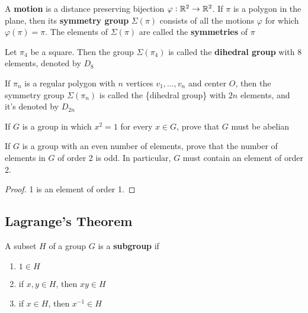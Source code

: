 \documentclass[11pt]{article}
\begin{document}
\begin{definition}[]
A \textbf{motion} is a distance preserving bijection \(\varphi:\mathbb{R}^2\to\mathbb{R}^2\). If
\(\pi\) is a polygon in the plane, then its \textbf{symmetry group} \(\Sigma(\pi)\)
consists of all the motions \(\varphi\) for which \(\varphi(\pi)=\pi\). The
elements of \(\Sigma(\pi)\) are called the \textbf{symmetries} of \(\pi\)
\end{definition}

Let \(\pi_4\) be a square. Then the group \(\Sigma(\pi_4)\) is called the
\textbf{dihedral group} with 8 elements, denoted by \(D_8\)

\begin{definition}[]
If \(\pi_n\) is a regular polygon with \(n\) vertices \(v_1,\dots,v_n\) and center
\(O\), then the symmetry group \(\Sigma(\pi_n)\) is called the \tf\{dihedral
group\} with \(2n\) elements, and it's denoted by \(D_{2n}\)
\end{definition}

\begin{exercise}
\label{ex2.26}
If \(G\) is a group in which \(x^2=1\) for every \(x\in G\), prove that \(G\)
must be abelian
\end{exercise}

\begin{exercise}
\label{ex2.27}
If \(G\) is a group with an even number of elements, prove that the number of
elements in \(G\) of order 2 is odd. In particular, \(G\) must contain an element of
order 2.
\end{exercise}

\begin{proof}
1 is an element of order 1.
\end{proof}
\subsection{Lagrange's Theorem}
\label{sec:org8824cfe}
\begin{theorem}[]

\end{theorem}

\begin{definition}[]
A subset \(H\) of a group \(G\) is a \textbf{subgroup} if
\begin{enumerate}
\item \(1\in H\)
\item if \(x,y\in H\), then \(xy\in H\)
\item if \(x\in H\), then \(x^{-1}\in H\)
\end{enumerate}
\end{definition}
\end{document}
